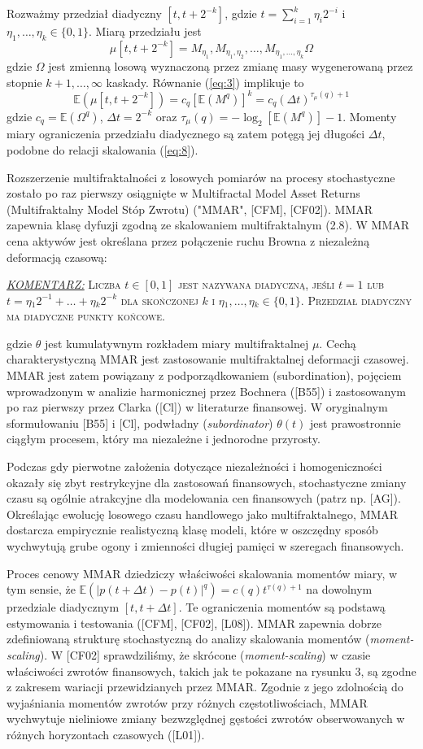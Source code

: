 \documentclass[12pt]{article}
\theoremstyle{definition}
\begin{document}
Rozważmy przedział diadyczny $[t,t+2^{-k}]$, gdzie $t=\sum_{i=1}^{k} {\eta_i 2^{-i}}$ i $\eta_1,\ldots ,\eta_k \in \{0,1\}$. Miarą przedziału jest
$$\mu[t,t+2^{-k}]=M_{\eta_1}, M_{\eta_1, \eta_2},\ldots , M_{\eta_1,\dots , \eta_k}\Omega$$
gdzie $\Omega$ jest zmienną losową wyznaczoną przez zmianę masy wygenerowaną przez stopnie $k+1, \ldots, \infty$ kaskady. Równanie (\ref{eq:3}) implikuje to
$$\mathbb{E}(\mu [t,t+2^{-k}]) = c_q [\mathbb{E}(M^q)]^k = c_q(\Delta t)^{\tau_{\mu}(q)+1} $$
gdzie $c_q = \mathbb{E}(\Omega ^q)$, $\Delta t = 2^{-k}$ oraz $\tau_{\mu}(q) = -\log_2[\mathbb{E}(M^q)]-1$. Momenty miary ograniczenia przedziału diadycznego są zatem potęgą jej długości $\Delta t$, podobne do relacji skalowania (\ref{eq:8}).

Rozszerzenie multifraktalności z losowych pomiarów na procesy stochastyczne zostało po raz pierwszy osiągnięte w Multifractal Model Asset Returns (Multifraktalny Model Stóp Zwrotu) ("MMAR", [CFM], [CF02]). MMAR zapewnia klasę dyfuzji zgodną ze skalowaniem multifraktalnym (2.8). W MMAR cena aktywów jest określana przez połączenie ruchu Browna z niezależną deformacją czasową:

\textsc{\uline{\emph{KOMENTARZ:}} Liczba $t \in [0,1]$ jest nazywana diadyczną, jeśli $t=1$ lub $t=\eta_1 2^{-1}+\ldots + \eta_k 2^{-k}$ dla skończonej $k$ i $\eta_1,\ldots ,\eta_k \in \{0,1\}$. Przedział diadyczny ma diadyczne punkty końcowe.}

gdzie $\theta$  jest kumulatywnym rozkładem miary multifraktalnej $\mu$. Cechą charakterystyczną MMAR jest zastosowanie multifraktalnej deformacji czasowej. MMAR jest zatem powiązany z podporządkowaniem (subordination), pojęciem wprowadzonym w analizie harmonicznej przez Bochnera ([B55]) i zastosowanym po raz pierwszy przez Clarka ([Cl]) w literaturze finansowej. W oryginalnym sformułowaniu [B55] i [Cl], podwładny (\textsl{subordinator}) $\theta (t)$ jest prawostronnie ciągłym procesem, który ma niezależne i jednorodne przyrosty.

Podczas gdy pierwotne założenia dotyczące niezależności i homogeniczności okazały się zbyt restrykcyjne dla zastosowań finansowych, stochastyczne zmiany czasu są ogólnie atrakcyjne dla modelowania cen finansowych (patrz np. [AG]). Określając ewolucję losowego czasu handlowego jako multifraktalnego, MMAR dostarcza empirycznie realistyczną klasę modeli, które w oszczędny sposób wychwytują grube ogony i zmienności długiej pamięci w szeregach finansowych.

Proces cenowy MMAR dziedziczy właściwości skalowania momentów miary, w tym sensie, że $\mathbb{E}(|p(t+\Delta t) - p(t)|^q)=c(q) t^{\tau (q)+1}$ na dowolnym przedziale diadycznym $[t, t+\Delta t]$. Te ograniczenia momentów są podstawą estymowania i testowania ([CFM], [CF02], [L08]). MMAR zapewnia dobrze zdefiniowaną strukturę stochastyczną do analizy skalowania momentów (\textsl{moment-scaling}). W [CF02] sprawdziliśmy, że skrócone (\textsl{moment-scaling}) w czasie właściwości zwrotów finansowych, takich jak te pokazane na rysunku 3, są zgodne z zakresem wariacji przewidzianych przez MMAR. Zgodnie z jego zdolnością do wyjaśniania momentów zwrotów przy różnych częstotliwościach, MMAR wychwytuje nieliniowe zmiany bezwzględnej gęstości zwrotów obserwowanych w różnych horyzontach czasowych ([L01]).
\end{document}
